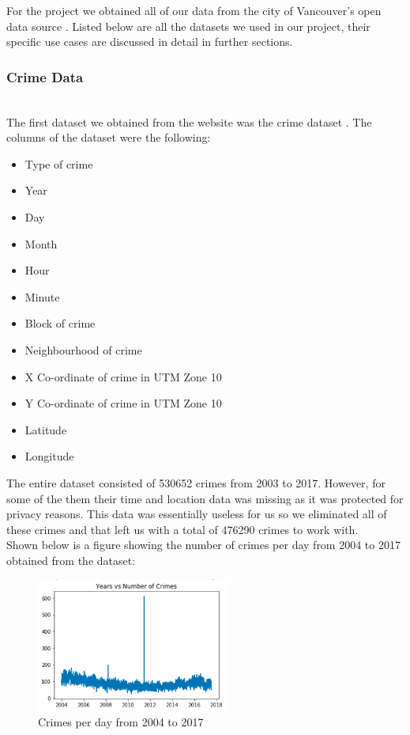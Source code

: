 \documentclass[conference]{IEEEtran}
\begin{document}
For the project we obtained all of our data from the city of Vancouver’s open data source \cite{data}. Listed below are all the datasets
we used in our project, their specific use cases are discussed in detail in further sections.\\

\subsubsection{Crime Data}

~\\The first dataset we obtained from the website was the crime dataset \cite{crime}. The columns of the dataset were the following:\\

\begin{itemize}
  \item Type of crime
  \item Year
  \item Day
  \item Month
  \item Hour
  \item Minute
  \item Block of crime
  \item Neighbourhood of crime
  \item X Co-ordinate of crime in UTM Zone 10
  \item Y Co-ordinate of crime in UTM Zone 10
  \item Latitude
  \item Longitude\\
\end{itemize}

The entire dataset consisted of 530652 crimes from 2003 to 2017. However, for some of the them their time
and location data was missing as it was protected for privacy reasons. This data was essentially useless for us so we eliminated
all of these crimes and that left us with a total of 476290 crimes to work with.\\

Shown below is a figure showing the number of crimes per day from 2004 to 2017 obtained from the dataset:

\begin{figure}[H]
  \centering
  \captionsetup{justification=centering}
  \centering
  \includegraphics[width=2.5in]{2.png}
  \caption{Crimes per day from 2004 to 2017}  
  \label{1}
\end{figure}
\end{document}
